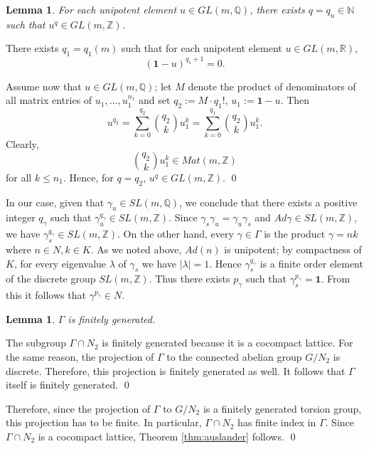 \documentclass[12pt]{article}
\theoremstyle{boldplain}
\newtheorem{lem}[equation]{Lemma}
\theoremstyle{bolddefinition}
\numberwithin{equation}{section}
\def\R{{\mathbb R}}
\def\N{{\mathbb N}}
\def\Z{{\mathbb Z}}
\def\Q{{\mathbb Q}}
\def\Ga{\Gamma}
\begin{document}
 
 
\begin{lem} For each unipotent element $u\in GL(m,\Q)$, there exists $q=q_u\in \N$ such that  
$u^q \in GL(m,\Z)$. 
 \end{lem} 
 \proof There exists $q_1 =q_1(m)$ such that for  each unipotent element $u\in GL(m, \R)$,
 $$
 ({\mathbf 1}-u)^{q_1 +1} =0. 
 $$

Assume now that  $u \in GL(m, \mathbb{Q})$; let $M$ denote 
the product of  denominators of all matrix entries of $u_1, \ldots, u_1^{n_1}$ and 
set  $q_2 := M\cdot q_1!$, $u_1 := {\mathbf 1} -u$. Then  
$$
u^{q_2}= \sum_{k=0}^{q_2} {q_2 \choose k} u^{k}_1=  \sum_{k=0}^{q_1} {q_2 \choose k} 
u^{k}_1. 
$$
Clearly,
$$
{q_2 \choose k} u^k_1 \in Mat(m, \mathbb{Z})
$$
for all $k \leq n_1$. Hence, for $q=q_2$, $u^q\in GL(m,\Z)$. \qed 


 
 
 \medskip 
 In our case, given that  $ \gamma_u \in  SL (m , \mathbb{Q})$, we conclude that there exists a positive integer $q_{\gamma}$ such that $\gamma_u ^{q_{\gamma}} \in  SL (m, \mathbb{Z})$.   Since $\gamma_s \gamma_u =\gamma_u \gamma_s $ and $Ad \gamma \in  SL (m, \mathbb{Z})$, we have $\gamma_s ^{q_{\gamma}} \in  SL (m, \mathbb{Z})$.   
 On the other hand,  every $ \gamma \in \Gamma$ is the product $ \gamma = n k$ where 
 $ n \in N, k \in K$. As we noted above,  $Ad (n)$ is unipotent; 
 by compactness of $K$,  for every eigenvalue $\lambda$ of   
 $\gamma_s $ we have $|\lambda| =1$.   Hence  $\gamma_s ^{q_{\gamma}} $ is a finite order element of the discrete group $ SL (m , \mathbb{Z})$. Thus there exists $p_{\gamma}$ such that  $\gamma_s ^{p_{\gamma}}  = {\mathbf 1}$.  From this it follows that  $\gamma^{p_{\gamma}} \in N$.  
  
 \begin{lem}
$\Ga$ is finitely generated. \end{lem} 
\proof The subgroup $\Gamma \cap N_2$ is finitely generated because it is a cocompact  lattice. For the same reason, the projection of $\Ga$ to the connected abelian group $G/N_2$ is discrete. Therefore, this projection is 
finitely generated as well. It follows that $\Ga$ itself is finitely generated. \qed 


\medskip  
Therefore, since the projection of $\Ga$ to $G/N_2$ is a finitely generated torsion group,  this projection has to be finite. 
In particular, $\Ga\cap N_2$ has finite index in $\Ga$. 
Since $\Ga\cap N_2$ is a cocompact lattice,  Theorem \ref{thm:auslander} follows.   \qed 
\end{document}
